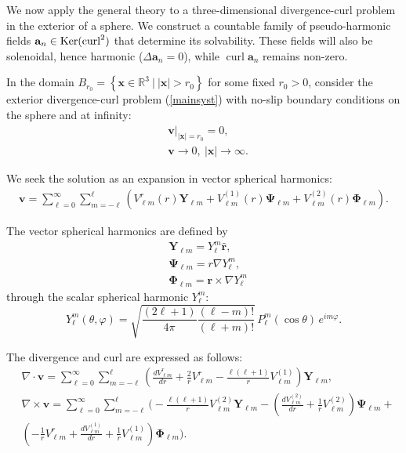 \documentclass[a4paper]{article}
\newcommand{\R}{\mathbb{R}}
\newcommand{\Ker}{{\rm Ker}}
\newcommand{\bx}{\mathbf{x}}
\newcommand{\ba}{\mathbf{a}}
\newcommand{\curl}{\operatorname{curl}}
\newcommand{\bv}{\mathbf{v}}
\begin{document}
We now apply the general theory to a three-dimensional divergence-curl problem in the exterior of a sphere. We construct a countable family of pseudo-harmonic fields $\ba_n \in \Ker(\curl^2)$ that determine its solvability. These fields will also be solenoidal, hence harmonic ($\Delta \ba_n =0$), while $\curl \ba_n$ remains non-zero.

In the domain $B_{r_0}=\left \{\bx \in \R^3 ~\big | ~ |\bx|>r_0 \right \}$ for some fixed $r_0>0$, consider the exterior divergence-curl problem (\ref{mainsyst}) with no-slip boundary conditions on the sphere and at infinity:
\begin{align}
&\bv \big |_{|\bx|=r_0} = 0, \label{boundcondsphere} \\
&\bv \to 0,~|\bx|\to \infty. \label{boundcondinfsphere}
\end{align}

We seek the solution as an expansion in vector spherical harmonics:
\begin{align*}
\bv =\sum _{\ell =0}^{\infty }\sum _{m=-\ell }^{\ell }\left(V_{\ell m}^{r}(r)\mathbf {Y} _{\ell m}+V_{\ell m}^{(1)}(r)\mathbf {\Psi}_{\ell m}+V_{\ell m}^{(2)}(r)\mathbf {\Phi}_{\ell m}\right).
\end{align*}

The vector spherical harmonics are defined by
\begin{align*}
&\mathbf {Y} _{\ell m}=Y_{\ell }^{m}{\hat {\mathbf {r} }},\\
&\mathbf {\Psi } _{\ell m}=r\nabla Y_{\ell }^{m},\\
&\mathbf {\Phi } _{\ell m}=\mathbf {r} \times \nabla Y_{\ell }^{m}
\end{align*}
through the scalar spherical harmonic $Y_{\ell }^{m}$:
$$
Y_{\ell }^{m}(\theta ,\varphi )={\sqrt {{\frac {(2\ell +1)}{4\pi }}{\frac {(\ell -m)!}{(\ell +m)!}}}}\,P_{\ell }^{m}(\cos {\theta })\,e^{im\varphi }.
$$

The divergence and curl are expressed as follows:
\begin{align*}
&\nabla \cdot \bv =\sum _{\ell =0}^{\infty }\sum _{m=-\ell }^{\ell }\left({\frac {dV_{\ell m}^{r}}{dr}}+{\frac {2}{r}}V_{\ell m}^{r}-{\frac {\ell (\ell +1)}{r}}V_{\ell m}^{(1)}\right)\mathbf Y_{\ell m},
\\
&\nabla \times \bv = \sum _{\ell =0}^{\infty }\sum _{m=-\ell }^{\ell }\Bigg(-{\frac {\ell (\ell +1)}{r}}V_{\ell m}^{(2)}\mathbf {Y} _{\ell m}-\left({\frac {dV_{\ell m}^{(2)}}{dr}}+{\frac {1}{r}}V_{\ell m}^{(2)}\right)\mathbf {\Psi } _{\ell m}+\\
&\left(-{\frac {1}{r}}V_{\ell m}^{r}+ {\frac {dV_{\ell m}^{(1)}}{dr}}+{\frac {1}{r}}V_{\ell m}^{(1)}\right)\mathbf {\Phi } _{\ell m}\Bigg).
\end{align*}
\end{document}
